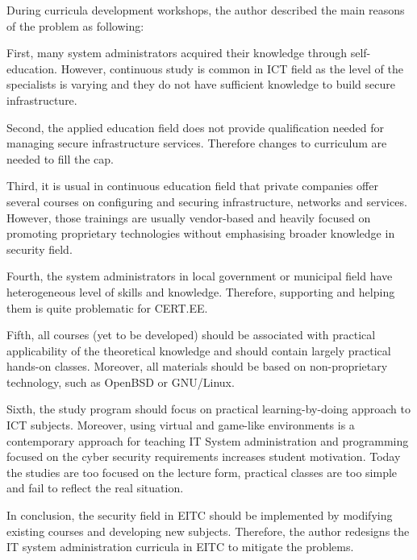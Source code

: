 During curricula development workshops, the author described the main reasons of the problem as following:

First, many system administrators acquired their knowledge through self-education. However, continuous study is common in \gls{ICT} field as the level of the specialists is varying and they do not have sufficient knowledge to build secure infrastructure.

Second, the applied education field does not provide qualification needed for managing secure infrastructure services. Therefore changes to curriculum are needed to fill the cap.

Third, it is usual in continuous education field that private companies offer several courses on configuring and securing infrastructure, networks and services. However, those trainings are usually vendor-based and heavily focused on promoting proprietary technologies without emphasising broader knowledge in security field.

Fourth, the system administrators in local government or municipal field have heterogeneous level of skills and knowledge. Therefore, supporting and helping them is quite problematic for \gls{CERT.EE}.

Fifth, all courses (yet to be developed) should be associated with practical applicability of the theoretical knowledge and should contain largely practical hands-on classes. Moreover, all materials should be based on non-proprietary technology, such as \gls{OpenBSD} or \gls{GNU/Linux}.

Sixth, the study program should focus on practical learning-by-doing approach to \gls{ICT} subjects.
 Moreover, using virtual and game-like environments is a contemporary approach for teaching IT System administration and programming focused on the cyber security requirements increases student motivation. Today the studies are too focused on the lecture form, practical classes are too simple and fail to reflect the real situation.

 
In conclusion, the security field in \gls{EITC} should be implemented by modifying existing courses and developing new subjects. Therefore, the author redesigns the IT system administration curricula in \gls{EITC} to mitigate the problems.



